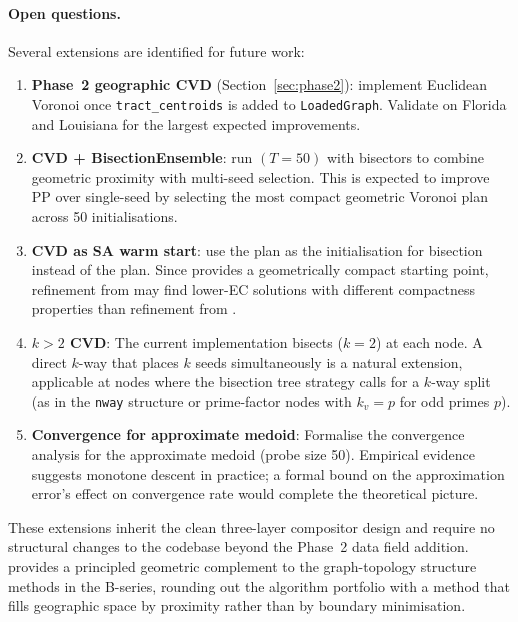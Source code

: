 \paragraph{Open questions.}
Several extensions are identified for future work:
\begin{enumerate}
\item \textbf{Phase~2 geographic CVD} (Section~\ref{sec:phase2}): implement
  Euclidean Voronoi once \texttt{tract\_centroids} is added to
  \texttt{LoadedGraph}.
  Validate on Florida and Louisiana for the largest expected improvements.

\item \textbf{CVD + BisectionEnsemble}: run \be{}$(T=50)$ with \cvd{}
  bisectors to combine geometric proximity with multi-seed selection.
  This is expected to improve PP over single-seed \cvd{} by selecting
  the most compact geometric Voronoi plan across 50 initialisations.

\item \textbf{CVD as SA warm start}: use the \cvd{} plan as the
  initialisation for \sa{} bisection instead of the \metis{} plan.
  Since \cvd{} provides a geometrically compact starting point, \sa{}
  refinement from \cvd{} may find lower-EC solutions with different
  compactness properties than \sa{} refinement from \metis{}.

\item \textbf{$k > 2$ CVD}: The current implementation bisects ($k=2$)
  at each node.
  A direct $k$-way \cvd{} that places $k$ seeds simultaneously is a natural
  extension, applicable at nodes where the bisection tree strategy calls for
  a $k$-way split (as in the \texttt{nway} structure or prime-factor nodes
  with $k_v = p$ for odd primes $p$).

\item \textbf{Convergence for approximate medoid}: Formalise the convergence
  analysis for the approximate medoid (probe size 50).
  Empirical evidence suggests monotone descent in practice; a formal bound
  on the approximation error's effect on convergence rate would complete
  the theoretical picture.
\end{enumerate}

These extensions inherit the clean three-layer compositor design and require
no structural changes to the codebase beyond the Phase~2 data field addition.
\cvd{} provides a principled geometric complement to the graph-topology
structure methods in the B-series, rounding out the algorithm portfolio
with a method that fills geographic space by proximity rather than by
boundary minimisation.
